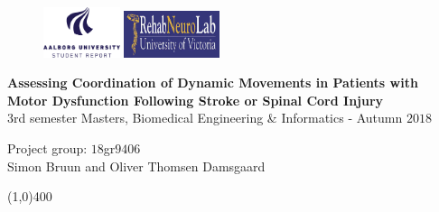 \clearpage
\thispagestyle{empty}

\begin{figure}[H]
	\raggedleft
	\includegraphics[width=0.2\textwidth]{setup/aaulogo-en.png}
	\hspace{8.5cm}
	\includegraphics[width=0.25\textwidth]{setup/RNL.png}
\end{figure} 

\vspace{3 cm}

\begin{center}
	\begin{Huge}
		\textbf{Assessing Coordination of Dynamic Movements in Patients with Motor Dysfunction Following Stroke or Spinal Cord Injury}\\
		\vspace{20 mm}
		3rd semester Masters, Biomedical Engineering \& Informatics - Autumn $2018$\\
		\vspace{3 mm}
	\end{Huge}
	{\Large Project group: $18$gr$9406$} \\
	\vspace{1cm}
	\large{Simon Bruun and Oliver Thomsen Damsgaard}
\end{center}
\vspace*{\fill}

\begin{center}
	\line(1,0){400}
\end{center}

